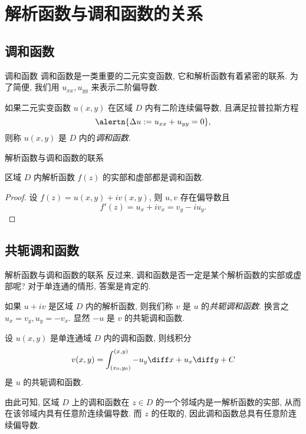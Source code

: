\section{解析函数与调和函数的关系}


\subsection{调和函数}

\begin{frame}{调和函数}
	\onslide<+->
	调和函数是一类重要的二元实变函数, 它和解析函数有着紧密的联系.
	\onslide<+->
	为了简便, 我们用 $u_{xx},u_{yy}$ 来表示二阶偏导数.

	\onslide<+->
	\begin{definition}
		如果二元实变函数 $u(x,y)$ 在区域 $D$ 内有二阶连续偏导数, 且满足拉普拉斯方程
		\[\alertn{\Delta u:=u_{xx}+u_{yy}=0},\]
		则称 $u(x,y)$ 是 $D$ 内的\emph{调和函数}.
	\end{definition}
\end{frame}


\begin{frame}{解析函数与调和函数的联系}
	\onslide<+->
	\begin{theorem}
		区域 $D$ 内解析函数 $f(z)$ 的实部和虚部都是调和函数.
	\end{theorem}

	\onslide<+->
	\begin{proof}
		设 $f(z)=u(x,y)+iv(x,y)$, 则 $u,v$ 存在偏导数且
			\[f'(z)=u_x+iv_x=v_y-iu_y.\]
		\onslide<+->{可知
			\[\Delta u=u_{xx}+u_{yy}=v_{yx}-v_{xy}=0,\]}
			\vspace{-\baselineskip}
		\onslide<+->{
			\[\Delta v=v_{xx}+v_{yy}=-u_{yx}+u_{xy}=0.\qedhere\]}
		\vspace{-\baselineskip}
	\end{proof}
\end{frame}


\subsection{共轭调和函数}
\begin{frame}{解析函数与调和函数的联系}
	\onslide<+->
	反过来, 调和函数是否一定是某个解析函数的实部或虚部呢?
	\onslide<+->
	对于单连通的情形, 答案是肯定的.

	\onslide<+->
	如果 $u+iv$ 是区域 $D$ 内的解析函数, 则我们称 $v$ 是 $u$ 的\emph{共轭调和函数}.
	\onslide<+->
	换言之 $u_x=v_y,u_y=-v_x$.
	\onslide<+->
	显然 $-u$ 是 $v$ 的共轭调和函数.
	\onslide<+->
	\begin{theorem}
		设 $u(x,y)$ 是单连通域 $D$ 内的调和函数, 则线积分
		\[v(x,y)=\int_{(x_0,y_0)}^{(x,y)}-u_y\diff x+u_x\diff y+C\]
		是 $u$ 的共轭调和函数.
	\end{theorem}
	\onslide<+->
	由此可知, 区域 $D$ 上的调和函数在 $z\in D$ 的一个邻域内是一解析函数的实部, 从而在该邻域内具有任意阶连续偏导数.
	\onslide<+->
	而 $z$ 的任取的, 因此调和函数总具有任意阶连续偏导数.
\end{frame}


